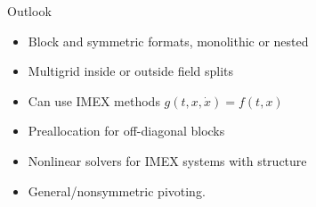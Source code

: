 \documentclass{beamer}
\begin{document}
\begin{frame}{Outlook}
  \begin{itemize}
  \item Block and symmetric formats, monolithic or nested
  \item Multigrid inside or outside field splits
  \item Can use IMEX methods $g(t,x,\dot x) = f(t,x)$
  \item Preallocation for off-diagonal blocks
  \item Nonlinear solvers for IMEX systems with structure
  \item General/nonsymmetric pivoting.
  \end{itemize}
\end{frame}
\end{document}
